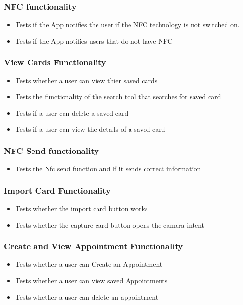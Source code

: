 \documentclass[english]{article}
\begin{document}
		\subsubsection{NFC functionality}
		\begin{itemize} 
			\item Tests if the App notifies the user if the NFC technology is not switched on.
			\item Tests if the App notifies users that do not have NFC
\\
					\href{url}{}
			
		\end{itemize}
		\subsubsection{View Cards Functionality}
		\begin{itemize}
			\item Tests whether a user can view thier saved cards
			\item Tests the functionality of the search tool that searches for saved card
			\item Tests if a user can delete a saved card
			\item Tests if a user can view the details of a saved card
\\
					\href{url}{}
		\end{itemize}
		\subsubsection{NFC Send functionality}
		\begin{itemize} 
			\item Tests the Nfc send function and if it sends correct information
\\
					\href{url}{}
		\end{itemize}

		\subsubsection{Import Card Functionality}
		\begin{itemize}
			\item Tests whether the import card button works
			\item Tests whether the capture card button opens the camera intent
\\
					\href{url}{}
		\end{itemize}
		\subsubsection{Create and View Appointment Functionality}
		\begin{itemize}
			\item Tests whether a user can Create an Appointment
			\item Tests whether a user can view saved Appointments
			\item Tests whether a user can delete an appointment
\\
					\href{url}{}
		\end{itemize}
\end{document}
